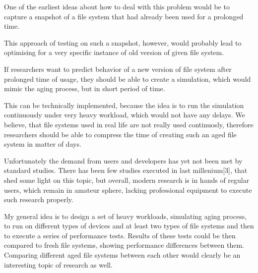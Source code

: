 \documentclass[
  color, %
  table, %
  lof,   %
  lot,   %
]{fithesis3}
\begin{document}




One of the earliest ideas about how to deal with this problem would be to capture a snapshot of a file system that had already been used for a prolonged time. 

This approach of testing on such a snapshot, however, would probably lead to optimising for a very specific instance of old version of given file system. 

If researchers want to predict behavior of a new version of file system after prolonged time of usage, they should be able to create a simulation, which would mimic the aging process, but in short period of time.

This can be technically implemented, because the idea is to run the simulation continuously under very heavy workload, which would not have any delays. We believe, that file systems used in real life are not really used continuosly, therefore researchers should be able to compress the time of creating such an aged file system in matter of days.

Unfortunately the demand from users and developers has yet not been met by standard studies. There has been few studies executed in last millenium[3], that shed some light on this topic, but overall, modern research is in hands of regular users, which remain in amateur sphere, lacking professional equipment to execute such research properly.

My general idea is to design a set of heavy workloads, simulating aging process, to run on different types of devices and at least two types of file systems and then to execute a series of performance tests. Results of these tests could be then compared to fresh file systems, showing performance differences between them. Comparing different aged file systems between each other would clearly be an interesting topic of research as well.
\end{document}
